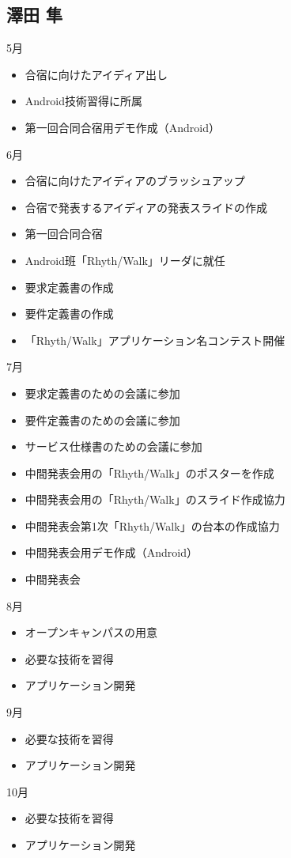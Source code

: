 \subsection{澤田 隼}
5月
\begin{itemize}
\item 合宿に向けたアイディア出し
\item Android技術習得に所属　
\item 第一回合同合宿用デモ作成（Android）
\end{itemize}
6月
\begin{itemize}
\item 合宿に向けたアイディアのブラッシュアップ
\item 合宿で発表するアイディアの発表スライドの作成
\item 第一回合同合宿
\item Android班「Rhyth/Walk」リーダに就任
\item 要求定義書の作成
\item 要件定義書の作成
\item 「Rhyth/Walk」アプリケーション名コンテスト開催
\end{itemize}
7月
\begin{itemize}
\item 要求定義書のための会議に参加
\item 要件定義書のための会議に参加
\item サービス仕様書のための会議に参加
\item 中間発表会用の「Rhyth/Walk」のポスターを作成　
\item 中間発表会用の「Rhyth/Walk」のスライド作成協力
\item 中間発表会第1次「Rhyth/Walk」の台本の作成協力
\item 中間発表会用デモ作成（Android）
\item 中間発表会
\end{itemize}
8月
\begin{itemize}
\item オープンキャンパスの用意
\item 必要な技術を習得
\item アプリケーション開発
\end{itemize}
9月
\begin{itemize}
\item 必要な技術を習得
\item アプリケーション開発
\end{itemize}
10月
\begin{itemize}
\item 必要な技術を習得
\item アプリケーション開発
\end{itemize}
